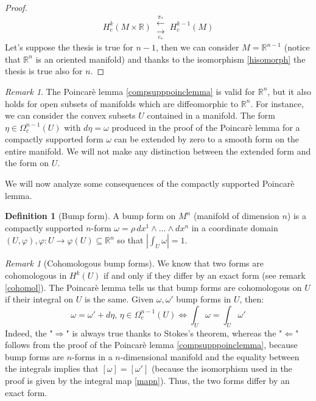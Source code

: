 \documentclass[a4paper,11pt,titlepage, article, oneside]{memoir}
\numberwithin{equation}{section}
\theoremstyle{definition}
\newtheorem{definition}[theorem]{Definition}
\theoremstyle{remark}
\newtheorem{remark}[theorem]{Remark}
\newcommand{\rfield}{\mathbb{R}}
\begin{document}
\begin{proof}
\begin{equation} \label{hisomorph}
H_c^k(M \times \rfield) \,  \substack{\overset{\pi_*}{\longleftarrow} \\ \underset{e_*}{\longrightarrow}} \, H_c^{k-1}(M)
\end{equation}
Let's suppose the thesis is true for $n-1$, then we can consider $M=\rfield^{n-1}$ (notice that $\rfield^n$ is an oriented manifold) and thanks to the isomorphism \eqref{hisomorph} the thesis is true also for $n$.
\end{proof}

\begin{remarkbox}
\begin{remark}
The Poincarè lemma \ref{compsupppoinclemma} is valid for $\rfield^n$, but it also holds for open subsets of manifolds which are diffeomorphic to $\rfield^n$. For instance, we can consider the convex subsets $U$ contained in a manifold. The form $\eta \in \Omega_c^{n-1}(U)$ with $d\eta=\omega$ produced in the proof of the Poincarè lemma for a compactly supported form $\omega$ can be extended by zero to a smooth form on the entire manifold. We will not make any distinction between the extended form and the form on $U$.
\end{remark}
\end{remarkbox}

We will now analyze some consequences of the compactly supported Poincarè lemma.

\begin{definition}[Bump form] \label{bumpform}
A bump form on $M^n$ (manifold of dimension $n$) is a compactly supported $n$-form $\omega = \rho \, dx^1 \wedge \ldots \wedge dx^n$ in a coordinate domain $(U, \varphi), \varphi \colon U \rightarrow \varphi(U) \subseteq \rfield^n $ so that $\left | \int_U \omega \right | = 1$.
\end{definition}

\begin{remarkbox}\begin{remark} [Cohomologous bump forms] \label{bumpremark}
We know that two forms are cohomologous in $H^k(U)$ if and only if they differ by an exact form (see remark \ref{cohomol}). The Poincarè lemma tells us that bump forms are cohomologous on $U$ if their integral on $U$ is the same. Given $\omega, \omega'$ bump forms in $U$, then:
\begin{equation}
\omega = \omega' + d \eta,\, \eta \in \Omega_c^{n-1}(U) \Longleftrightarrow \int_U \omega = \int_U \omega'
\end{equation}
Indeed, the "$\Rightarrow$" is always true thanks to Stokes's theorem, whereas the "$\Leftarrow$" follows from the proof of the Poincarè lemma \ref{compsupppoinclemma}, because bump forms are $n$-forms in a $n$-dimensional manifold and the equality between the integrals implies that $[\omega] = [\omega']$ (because the isomorphism used in the proof is given by the integral map \eqref{mapn}). Thus, the two forms differ by an exact form.
\end{remark}\end{remarkbox}
\end{document}
